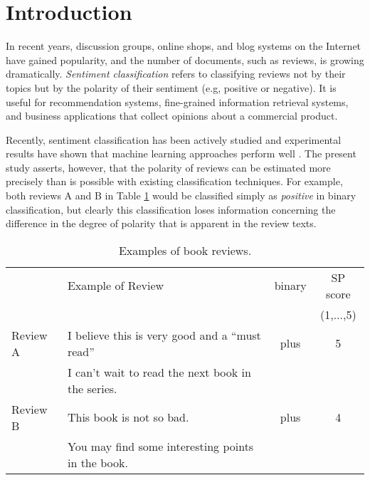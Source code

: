 \documentclass[japanese]{jnlp_1.3d}
\begin{document}
\maketitle






\section{Introduction}
In recent years, discussion groups, online shops, and blog systems on the Internet have gained popularity, and the number of documents, such as reviews, is growing dramatically. \textit{Sentiment classification} refers to classifying reviews not by their topics but by the polarity of their sentiment (e.g, positive or negative). It is useful for recommendation systems, fine-grained information retrieval systems, and business applications that collect opinions about a commercial product.

Recently, sentiment classification has been actively studied and experimental results have shown that machine learning approaches perform well \cite{Pang2002,Pang2004,Mullen2004_a,Turny2002}. The present study asserts, however, that the polarity of reviews can be estimated more precisely than is possible with existing classification techniques. For example, both reviews A and B in Table \ref{tab:reviewSample} would be classified simply as \textit{positive} in binary classification, but clearly this classification loses information concerning the difference in the degree of polarity that is apparent in the review texts.

\begin{table}[b]
\caption{Examples of book reviews.}
\label{tab:reviewSample}
 \begin{center}
  \begin{tabular}{|l|l|c|c|} \hline
         & Example of Review  & binary & SP score \\
         &                    &       & (1,...,5) \\ \hline
Review A & I believe this is very good and a ``must read''  & plus & 5 \\
         & I can't wait to read the next book in the series. & & \\ \hline
Review B & This book is not so bad. & plus & 4 \\
         & You may find some interesting points in the book. & & \\ \hline
  \end{tabular}
 \end{center}
\end{table}
\end{document}
